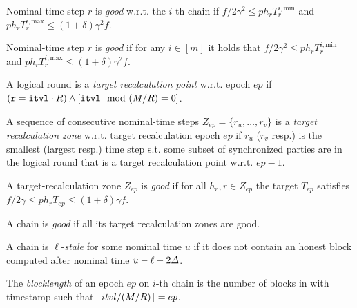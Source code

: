 \begin{cccItemize}[noitemsep]
    \item Nominal-time step $r$ is \emph{good} w.r.t. the $i$-th chain if $f /2\gamma^2 \le p h_r T^{i, \mathrm{min}}_r$ and $p h_r T^{i, \mathrm{max}}_r \le (1 + \delta) \gamma^2 f$.

    \item Nominal-time step $r$ is \emph{good} if for any $i \in [m]$ it holds that $f /2\gamma^2 \le p h_r T^{i, \mathrm{min}}_r$ and $p h_r T^{i, \mathrm{max}}_r \le (1 + \delta) \gamma^2 f$.

    \item A logical round \protocolTime{\interval}{\round} is a \emph{target recalculation point} w.r.t. epoch $ep$ if $(\mathtt{r} = \mathtt{itvl} \cdot R) \wedge [\mathtt{itvl} \mod (M / R) = 0]$.

    \item A sequence of consecutive nominal-time steps $Z_{ep} = \{ r_u, \ldots, r_v \}$ is a \emph{target recalculation zone} w.r.t. target recalculation epoch $ep$ if $r_u$ ($r_v$ resp.) is the smallest (largest resp.) time step s.t. some subset of synchronized parties are in the logical round that is a target recalculation point w.r.t. $ep - 1$.

    \item A target-recalculation zone $Z_{ep}$ is \emph{good} if for all $h_r, r \in Z_{ep}$ the target $T_{ep}$ satisfies $f / 2\gamma \le p h_r T_{ep} \le (1 + \delta) \gamma f$.

    \item A chain is \emph{good} if all its target recalculation zones are good.

    \item A chain is $\ell$-\emph{stale} for some nominal time $u$ if it does not contain an honest block computed after nominal time $u - \ell - 2\varDelta$.

    \item The \emph{blocklength} of an epoch $ep$ on $i$-th chain \chain is the number of blocks in \chain with timestamp  such that $\lceil itvl / (M / R) \rceil = ep$.
\end{cccItemize}

